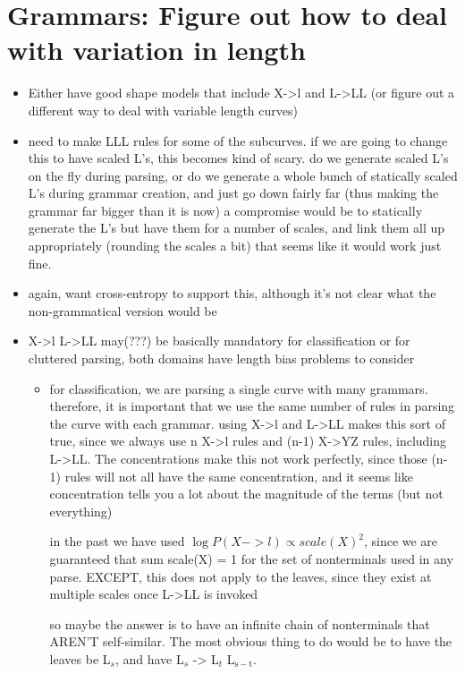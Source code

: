 \documentclass{book}
\begin{document}
\section{Grammars: Figure out how to deal with variation in length}
\label{sec-7_13}

\begin{itemize}
\item Either have good shape models that include X->l and L->LL (or
    figure out a different way to deal with variable length curves)
\item need to make LLL rules for some of the subcurves. if we are going
    to change this to have scaled L's, this becomes kind of scary. do
    we generate scaled L's on the fly during parsing, or do we
    generate a whole bunch of statically scaled L's during grammar
    creation, and just go down fairly far (thus making the grammar far
    bigger than it is now) a compromise would be to statically
    generate the L's but have them for a number of scales, and link
    them all up appropriately (rounding the scales a bit) that seems
    like it would work just fine.
\item again, want cross-entropy to support this, although it's not
    clear what the non-grammatical version would be
\item X->l L->LL may(???) be basically mandatory for classification or for
    cluttered parsing, both domains have length bias problems to
    consider

\begin{itemize}
\item for classification, we are parsing a single curve with many
      grammars. therefore, it is important that we use the same number
      of rules in parsing the curve with each grammar. using X->l and
      L->LL makes this sort of true, since we always use n X->l rules
      and (n-1) X->YZ rules, including L->LL. The concentrations make
      this not work perfectly, since those (n-1) rules will not all
      have the same concentration, and it seems like concentration
      tells you a lot about the magnitude of the terms (but not
      everything)

      in the past we have used $\log P(X->l) \propto scale(X)^2$, since
      we are guaranteed that sum scale(X) = 1 for the set of
      nonterminals used in any parse. EXCEPT, this does not apply to
      the leaves, since they exist at multiple scales once L->LL is
      invoked

      so maybe the answer is to have an infinite chain of nonterminals
      that AREN'T self-similar. The most obvious thing to do would be
      to have the leaves be L$_s$, and have L$_s$ -> L$_t$ L$_{\mathrm{s-t}}$.


\end{itemize}
\end{itemize}
\end{document}

